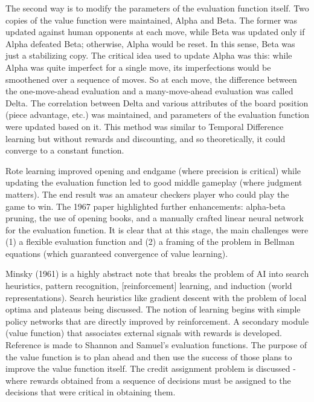 The second way is to modify the parameters of the evaluation function itself. Two copies of the value function were maintained, Alpha and Beta. The former was updated against human opponents at each move, while Beta was updated only if Alpha defeated Beta; otherwise, Alpha would be reset. In this sense, Beta was just a stabilizing copy. The critical idea used to update Alpha was this: while Alpha was quite imperfect for a single move, its imperfections would be smoothened over a sequence of moves. So at each move, the difference between the one-move-ahead evaluation and a many-move-ahead evaluation was called Delta. The correlation between Delta and various attributes of the board position (piece advantage, etc.) was maintained, and parameters of the evaluation function were updated based on it. This method was similar to Temporal Difference learning but without rewards and discounting, and so theoretically, it could converge to a constant function. 

Rote learning improved opening and endgame (where precision is critical) while updating the evaluation function led to good middle gameplay (where judgment matters). The end result was an amateur checkers player who could play the game to win. The 1967 paper highlighted further enhancements: alpha-beta pruning, the use of opening books, and a manually crafted linear neural network for the evaluation function. It is clear that at this stage, the main challenges were (1) a flexible evaluation function and (2) a framing of the problem in Bellman equations (which guaranteed convergence of value learning). 

Minsky (1961) is a highly abstract note that breaks the problem of AI into search heuristics, pattern recognition, [reinforcement] learning, and induction (world representations). Search heuristics like gradient descent with the problem of local optima and plateaus being discussed. The notion of learning begins with simple policy networks that are directly improved by reinforcement. A secondary module (value function) that associates external signals with rewards is developed. Reference is made to Shannon and Samuel’s evaluation functions. The purpose of the value function is to plan ahead and then use the success of those plans to improve the value function itself. The credit assignment problem is discussed - where rewards obtained from a sequence of decisions must be assigned to the decisions that were critical in obtaining them.

